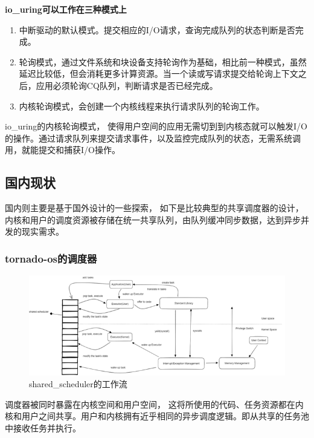 \textbf{io\_uring可以工作在三种模式上}

\begin{enumerate}
\item 中断驱动的默认模式。提交相应的I/O请求，查询完成队列的状态判断是否完成。
\item 轮询模式，通过文件系统和块设备支持轮询作为基础，相比前一种模式，虽然延迟比较低，但会消耗更多计算资源。当一个读或写请求提交给轮询上下文之后，应用必须轮询CQ队列，判断请求是否已经完成。
\item 内核轮询模式，会创建一个内核线程来执行请求队列的轮询工作。
\end{enumerate}

io\_uring的内核轮询模式， 使得用户空间的应用无需切到到内核态就可以触发I/O的操作。通过请求队列来提交请求事件，以及监控完成队列的状态，无需系统调用，就能提交和捕获I/O操作。


\subsection{国内现状}

国内则主要是基于国外设计的一些探索， 如下是比较典型的共享调度器的设计，内核和用户的调度资源被存储在统一共享队列，由队列缓冲同步数据，达到异步并发的现实需求。

\subsubsection{tornado-os的调度器}

\begin{figure}[htb]
    \figureCapSet
    \centering
    \includegraphics[width=.8\linewidth]{figure/c1/sharedscheduler.png}
    \caption{shared\_scheduler的工作流}
    \label{figure:c1sharedscheduler}
\end{figure}

调度器被同时暴露在内核空间和用户空间， 这将所使用的代码、任务资源都在内核和用户之间共享。用户和内核拥有近乎相同的异步调度逻辑。即从共享的任务池中接收任务并执行。

